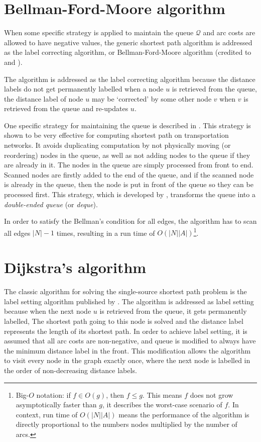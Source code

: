 \section{Bellman-Ford-Moore algorithm} \label{section:labelcorrectingalgorithm}
When some specific strategy is applied to maintain the queue $\mathcal{Q}$
and arc costs are allowed to have negative values,
the generic shortest path algorithm is addressed as the label correcting algorithm,
or Bellman-Ford-Moore algorithm (credited to \citet{Bellman, Ford} and \citet{Moore}).

The algorithm is addressed as the label correcting algorithm
because the distance labels do not get permanently labelled when a node $u$ is retrieved from the queue,
the distance label of node $u$ may be `corrected' by some other node $v$ when $v$ is retrieved from the queue and re-updates $u$.

One specific strategy for maintaining the queue is described in \citet{Sheffi}.
This strategy is shown to be very effective for computing shortest path on transportation networks.
It avoids duplicating computation by not physically moving (or reordering) nodes in the queue,
as well as not adding nodes to the queue if they are already in it.
The nodes in the queue are simply processed from front to end.
Scanned nodes are firstly added to the end of the queue,
and if the scanned node is already in the queue,
then the node is put in front of the queue so they can be processed first.
This strategy, which is developed by \citet{Pape}, transforms the queue into a \emph{double-ended queue} (or \emph{deque}).

In order to satisfy the Bellman's condition for all edges,
the algorithm has to scan all edges $|N|-1$ times,
resulting in a run time of $O(|N||A|)$\footnote{Big-$O$ notation: if $f \in O(g)$, then $f \leq g$. This means $f $ does not grow asymptotically faster than $g$, it describes the worst-case scenario of $f$. In context, run time of $O(|N||A|)$ means the performance of the algorithm is directly proportional to the numbers nodes multiplied by the number of arcs.}.

\section{Dijkstra's algorithm} \label{sec:dijkstra}
The classic algorithm for solving the single-source shortest path problem is the label setting algorithm published by \citet{Dijkstra}.
The algorithm is addressed as label setting because when the next node $u$ is retrieved from the queue,
it gets permanently labelled,
The shortest path going to this node is solved and 
the distance label represents the length of its shortest path.
In order to achieve label setting, 
it is assumed that all arc costs are non-negative,
and queue is modified to always have the minimum distance label in the front.
This modification allows the algorithm to visit every node in the graph exactly once,
where the next node is labelled in the order of non-decreasing distance labels.

